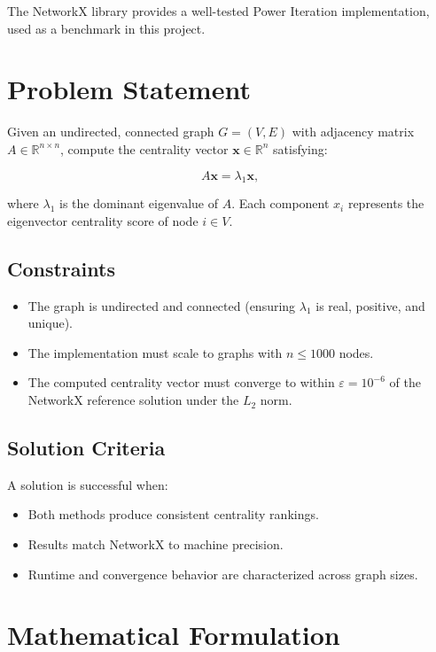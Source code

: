 \documentclass[12pt]{article}
\begin{document}
The NetworkX library provides a well-tested Power Iteration implementation, used as a benchmark in this project.

\section{Problem Statement}

Given an undirected, connected graph $G = (V, E)$ with adjacency matrix $A \in \mathbb{R}^{n \times n}$, compute the centrality vector $\mathbf{x} \in \mathbb{R}^n$ satisfying:

\[
A\mathbf{x} = \lambda_1 \mathbf{x},
\]

where $\lambda_1$ is the dominant eigenvalue of $A$. Each component $x_i$ represents the eigenvector centrality score of node $i \in V$.

\subsection{Constraints}

\begin{itemize}
    \item The graph is undirected and connected (ensuring $\lambda_1$ is real, positive, and unique).
    \item The implementation must scale to graphs with $n \leq 1000$ nodes.
    \item The computed centrality vector must converge to within $\varepsilon = 10^{-6}$ of the NetworkX reference solution under the $L_2$ norm.
\end{itemize}

\subsection{Solution Criteria}

A solution is successful when:
\begin{itemize}
    \item Both methods produce consistent centrality rankings.
    \item Results match NetworkX to machine precision.
    \item Runtime and convergence behavior are characterized across graph sizes.
\end{itemize}

\section{Mathematical Formulation}
\end{document}
